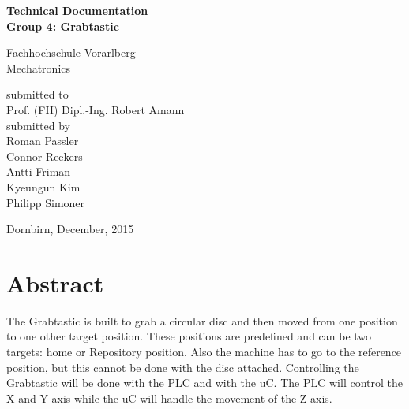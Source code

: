 \documentclass[a4paper,12pt]{scrreprt}
\begin{document}



\newpage
\begin{titlepage}
  \mbox{}
  \vspace{5mm}
  \begin{center}
    \huge{\textbf{\sffamily Technical Documentation}} \\
    \huge{\textbf{\sffamily Group 4: Grabtastic}}\\
  \end{center}
  \vspace{40mm}
  \begin{flushright}

  \vspace{20mm}
  Fachhochschule Vorarlberg\\
  Mechatronics

  \vspace{40mm}
  submitted to\\\relax
Prof. (FH) Dipl.-Ing. Robert Amann\\
  submitted by\\\relax
Roman Passler\\
Connor Reekers\\
Antti Friman\\
Kyeungun Kim\\
Philipp Simoner

  \vspace{20mm}
  Dornbirn, December, 2015
  \end{flushright}
\end{titlepage}


%
%
\chapter*{Abstract}

The Grabtastic is built to grab a circular disc and then moved from one position to one other target position. These positions are predefined and can be two targets: home or \acs{Repository} position. Also the machine has to go to the reference position, but this cannot be done with the disc attached. Controlling the Grabtastic will be done with the \acs{PLC} and with the \acs{uC}. The \acs{PLC} will control the X and Y axis while the \acs{uC} will handle the movement of the Z axis. 
\end{document}
